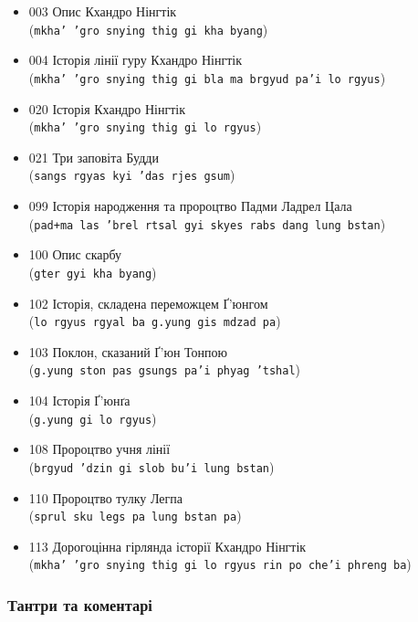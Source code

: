 \documentclass{article}
\begin{document}
\begingroup\raggedright
\begin{itemize}
\item 003 Опис Кхандро Нінгтік \\ (\texttt{mkha' 'gro snying thig gi kha byang})
\item 004 Історія лінії гуру Кхандро Нінгтік \\ (\texttt{mkha' 'gro snying thig gi bla ma brgyud pa'i lo rgyus})
\item 020 Історія Кхандро Нінгтік \\ (\texttt{mkha' 'gro snying thig gi lo rgyus})
\item 021 Три заповіта Будди \\ (\texttt{sangs rgyas kyi 'das rjes gsum})
\item 099 Історія народження та пророцтво Падми Ладрел Цала \\ (\texttt{pad+ma las 'brel rtsal gyi skyes rabs dang lung bstan})
\item 100 Опис скарбу \\ (\texttt{gter gyi kha byang})
\item 102 Історія, складена переможцем Ґ'юнгом \\ (\texttt{lo rgyus rgyal ba g.yung gis mdzad pa})
\item 103 Поклон, сказаний Ґ'юн Тонпою \\ (\texttt{g.yung ston pas gsungs pa'i phyag 'tshal})
\item 104 Історія Ґ'юнґа \\ (\texttt{g.yung gi lo rgyus})
\item 108 Пророцтво учня лінії \\ (\texttt{brgyud 'dzin gi slob bu'i lung bstan})
\item 110 Пророцтво тулку Легпа \\ (\texttt{sprul sku legs pa lung bstan pa})
\item 113 Дорогоцінна гірлянда історії Кхандро Нінгтік \\ (\texttt{mkha' 'gro snying thig gi lo rgyus rin po che'i phreng ba})
\end{itemize}
\endgroup

\subsubsection{Тантри та коментарі}
\end{document}

